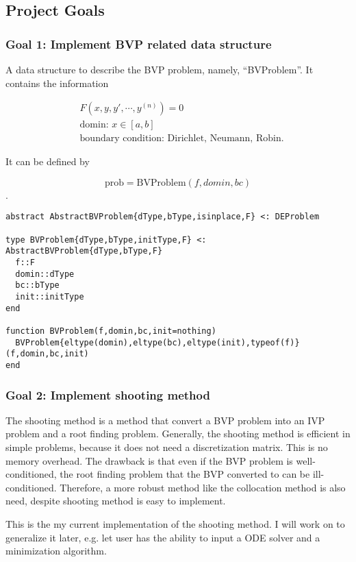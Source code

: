 \documentclass[a4paper,12pt,onecolumn]{article}
\begin{document}
\subsection{Project Goals}
\subsubsection{Goal 1: Implement BVP related data structure}
A data structure to describe the BVP problem, namely, ``BVProblem''. It contains the information

\begin{align*}
	&F(x, y, y', \cdots, y^{(n)}) = 0 \\
	&\text{domin: }x \in [a, b] \\
	&\text{boundary condition: Dirichlet, Neumann, Robin}.
\end{align*}

It can be defined by

\[\text{prob} = \text{BVProblem}(f,domin,bc)\].

\begin{lstlisting}[mathescape=true]
abstract AbstractBVProblem{dType,bType,isinplace,F} <: DEProblem

type BVProblem{dType,bType,initType,F} <: AbstractBVProblem{dType,bType,F}
  f::F
  domin::dType
  bc::bType
  init::initType
end

function BVProblem(f,domin,bc,init=nothing)
  BVProblem{eltype(domin),eltype(bc),eltype(init),typeof(f)}(f,domin,bc,init)
end

\end{lstlisting}


\subsubsection{Goal 2: Implement shooting method}
The shooting method is a method that convert a BVP problem into an IVP problem and a root finding
problem. Generally, the shooting method is efficient in simple problems, because it does not need
a discretization matrix. This is no memory overhead. The drawback is that even if the BVP problem
is well-conditioned, the root finding problem that the BVP converted to can be ill-conditioned.
Therefore, a more robust method like the collocation method is also need, despite shooting method
is easy to implement.

This is the my current implementation of the shooting method. I will work on to generalize it later,
e.g. let user has the ability to input a ODE solver and a minimization algorithm.
\end{document}
